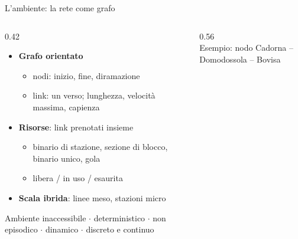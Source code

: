 \documentclass[11pt,aspectratio=169]{beamer}
\begin{document}
\begin{frame}[label=cadorna]{L'ambiente: la rete come grafo}
	\vspace*{-0.5cm}
	\begin{columns}[T]
		\begin{column}{0.42\textwidth}
			\begin{itemize}\setlength{\itemsep}{0pt}
				\item \textbf{Grafo orientato}
				\begin{itemize}
					\item nodi: inizio, fine, diramazione
					\item link: un verso; lunghezza, velocità massima, capienza
				\end{itemize}
				\item \textbf{Risorse}: link prenotati insieme
				\begin{itemize}
					\item binario di stazione, sezione di blocco, binario unico, gola
					\item libera / in uso / esaurita
				\end{itemize}
				\item \textbf{Scala ibrida}: linee meso, stazioni micro
			\end{itemize}
			\begin{alertblock}{Ambiente}
				\small inaccessibile $\cdot$ deterministico $\cdot$ non episodico $\cdot$ dinamico $\cdot$ discreto e continuo
			\end{alertblock}
		\end{column}
		\begin{column}{0.56\textwidth}
			\centering
			\resizebox{\linewidth}{!}{}\\
			{\scriptsize\color{mrsNero!65}Esempio: nodo Cadorna -- Domodossola -- Bovisa}
		\end{column}
	\end{columns}
\end{frame}
\end{document}
